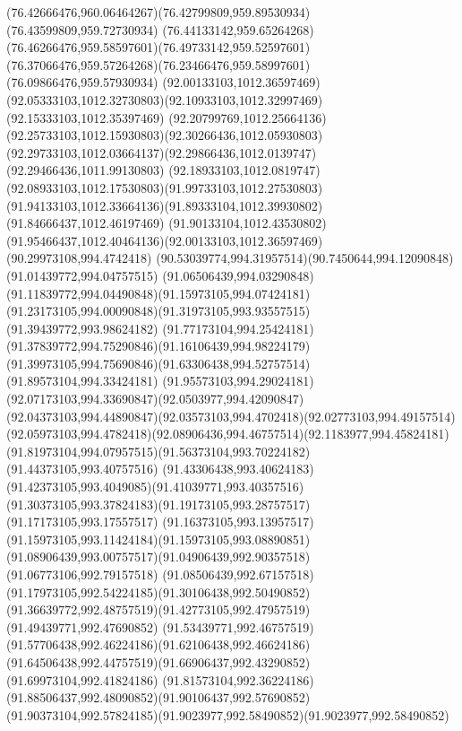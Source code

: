 {    \curveto(76.42666476,960.06464267)(76.42799809,959.89530934)(76.43599809,959.72730934)
    \curveto(76.44133142,959.65264268)(76.46266476,959.58597601)(76.49733142,959.52597601)
    \curveto(76.37066476,959.57264268)(76.23466476,959.58997601)(76.09866476,959.57930934)
    \moveto(92.00133103,1012.36597469)
    \curveto(92.05333103,1012.32730803)(92.10933103,1012.32997469)(92.15333103,1012.35397469)
    \curveto(92.20799769,1012.25664136)(92.25733103,1012.15930803)(92.30266436,1012.05930803)
    \curveto(92.29733103,1012.03664137)(92.29866436,1012.0139747)(92.29466436,1011.99130803)
    \curveto(92.18933103,1012.0819747)(92.08933103,1012.17530803)(91.99733103,1012.27530803)
    \curveto(91.94133103,1012.33664136)(91.89333104,1012.39930802)(91.84666437,1012.46197469)
    \curveto(91.90133104,1012.43530802)(91.95466437,1012.40464136)(92.00133103,1012.36597469)
    \closepath
    \moveto(90.29973108,994.4742418)
    \curveto(90.53039774,994.31957514)(90.7450644,994.12090848)(91.01439772,994.04757515)
    \curveto(91.06506439,994.03290848)(91.11839772,994.04490848)(91.15973105,994.07424181)
    \curveto(91.23173105,994.00090848)(91.31973105,993.93557515)(91.39439772,993.98624182)
    \curveto(91.77173104,994.25424181)(91.37839772,994.75290846)(91.16106439,994.98224179)
    \curveto(91.39973105,994.75690846)(91.63306438,994.52757514)(91.89573104,994.33424181)
    \curveto(91.95573103,994.29024181)(92.07173103,994.33690847)(92.0503977,994.42090847)
    \curveto(92.04373103,994.44890847)(92.03573103,994.4702418)(92.02773103,994.49157514)
    \curveto(92.05973103,994.4782418)(92.08906436,994.46757514)(92.1183977,994.45824181)
    \curveto(91.81973104,994.07957515)(91.56373104,993.70224182)(91.44373105,993.40757516)
    \curveto(91.43306438,993.40624183)(91.42373105,993.4049085)(91.41039771,993.40357516)
    \curveto(91.30373105,993.37824183)(91.19173105,993.28757517)(91.17173105,993.17557517)
    \curveto(91.16373105,993.13957517)(91.15973105,993.11424184)(91.15973105,993.08890851)
    \curveto(91.08906439,993.00757517)(91.04906439,992.90357518)(91.06773106,992.79157518)
    \curveto(91.08506439,992.67157518)(91.17973105,992.54224185)(91.30106438,992.50490852)
    \curveto(91.36639772,992.48757519)(91.42773105,992.47957519)(91.49439771,992.47690852)
    \curveto(91.53439771,992.46757519)(91.57706438,992.46224186)(91.62106438,992.46624186)
    \curveto(91.64506438,992.44757519)(91.66906437,992.43290852)(91.69973104,992.41824186)
    \curveto(91.81573104,992.36224186)(91.88506437,992.48090852)(91.90106437,992.57690852)
    \curveto(91.90373104,992.57824185)(91.9023977,992.58490852)(91.9023977,992.58490852)
}
